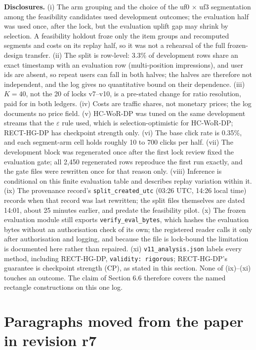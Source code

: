 \documentclass[sigconf,anonymous,review]{acmart}
\newcommand{\eps}{\varepsilon}
\begin{document}
\textbf{Disclosures.} (i) The arm grouping and the choice of the uf0 $\times$ uf3 segmentation among the feasibility candidates used development outcomes; the evaluation half was used once, after the lock, but the evaluation uplift gap may shrink by selection. A feasibility holdout froze only the item groups and recomputed segments and costs on its replay half, so it was not a rehearsal of the full frozen-design transfer. (ii) The split is row-level: 3.3\% of development rows share an exact timestamp with an evaluation row (multi-position impressions), and user ids are absent, so repeat users can fall in both halves; the halves are therefore not independent, and the log gives no quantitative bound on their dependence. (iii) $K = 40$, not the 20 of locks v7--v10, is a pre-stated change for ratio resolution, paid for in both ledgers. (iv) Costs are traffic shares, not monetary prices; the log documents no price field. (v) HC-WoR-DP was tuned on the same development streams that the $\eps$ rule used, which is selection-optimistic for HC-WoR-DP; RECT-HG-DP has checkpoint strength only. (vi) The base click rate is 0.35\%, and each segment-arm cell holds roughly 10 to 700 clicks per half. (vii) The development block was regenerated once after the first lock review fixed the evaluation gate; all 2,450 regenerated rows reproduce the first run exactly, and the gate files were rewritten once for that reason only. (viii) Inference is conditional on this finite evaluation table and describes replay variation within it. (ix) The provenance record's \texttt{split\_created\_utc} (03:26 UTC, 14:26 local time) records when that record was last rewritten; the split files themselves are dated 14:01, about 25 minutes earlier, and predate the feasibility pilot. (x) The frozen evaluation module still exports \texttt{verify\_eval\_bytes}, which hashes the evaluation bytes without an authorisation check of its own; the registered reader calls it only after authorisation and logging, and because the file is lock-bound the limitation is documented here rather than repaired. (xi) \texttt{v11\_analysis.json} labels every method, including RECT-HG-DP, \texttt{validity: rigorous}; RECT-HG-DP's guarantee is checkpoint strength (CP), as stated in this section. None of (ix)--(xi) touches an outcome. The claim of Section 6.6 therefore covers the named rectangle constructions on this one log.

\section{Paragraphs moved from the paper in revision r7}\label{app:moved}
\end{document}
